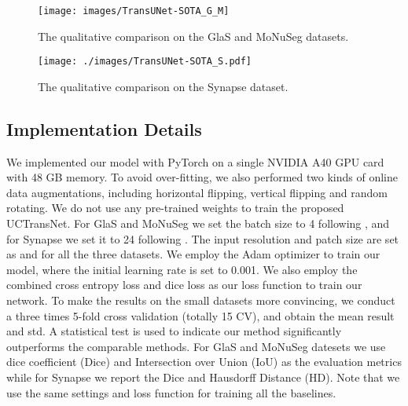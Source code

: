 \documentclass[letterpaper]{article} \usepackage{aaai22}  \usepackage{times}  \usepackage{helvet}  \usepackage{courier}  \usepackage[hyphens]{url}  \usepackage{graphicx} \urlstyle{rm} \def\UrlFont{\rm}  \usepackage{natbib}  \usepackage{caption} \DeclareCaptionStyle{ruled}{labelfont=normalfont,labelsep=colon,strut=off} \frenchspacing  \setlength{\pdfpagewidth}{8.5in}  \setlength{\pdfpageheight}{11in}  \usepackage{algorithm}
\begin{document}
	
	\begin{figure*}[!h]
		\centering
		\texttt{[image: images/TransUNet-SOTA\_G\_M]} \caption{The qualitative comparison on the GlaS and MoNuSeg datasets.}
		\label{SOTA_G_M}
	\end{figure*}
	
	\begin{figure}[!h]
		\centering
		\texttt{[image: ./images/TransUNet-SOTA\_S.pdf]} \caption{The qualitative comparison on the Synapse dataset.}
		\label{SOTA_S}
	\end{figure}
	
	\subsection{Implementation Details}
	We implemented our model with PyTorch on a single NVIDIA A40 GPU card with 48 GB memory. To avoid over-fitting, we also performed two kinds of online data augmentations, including horizontal flipping, vertical flipping and random rotating. 
	We do not use any pre-trained weights to train the proposed UCTransNet.
	For GlaS and MoNuSeg we set the batch size to 4 following \cite{MedicalTransformerGated_2021}, and for Synapse we set it to 24 following \cite{TransUNetTransformersMake_2021}.
	The input resolution and patch size  are set as  and  for all the three datasets.
	We employ the Adam optimizer to train our model, where the initial learning rate is set to 0.001.
	We also employ the combined cross entropy loss and dice loss as our loss function to train our network.
	To make the results on the small datasets more convincing, we conduct a three times 5-fold cross validation (totally 15 CV), and obtain the mean result and std. 
	A statistical test is used to indicate our method significantly outperforms the comparable methods.
	For GlaS and MoNuSeg datesets we use dice coefficient (Dice) and Intersection over Union (IoU) as the evaluation metrics while for Synapse we report the Dice and Hausdorff Distance (HD). 
	Note that we use the same settings and loss function for training all the baselines.
	
	
	
	
	
\end{document}
